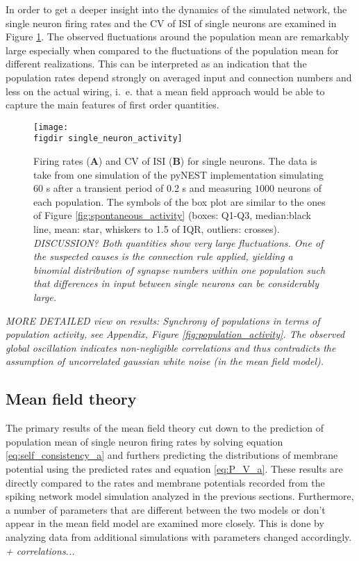 In order to get a deeper insight into the dynamics of the simulated network, the single neuron firing 
rates and the CV of ISI of single neurons are examined in Figure \ref{fig:single_neuron_activity}.
The observed fluctuations around the population mean are remarkably large especially when compared 
to the fluctuations of the population mean for different realizations. This can be interpreted as 
an indication that the population rates depend strongly on averaged input and connection numbers
and less on the actual wiring, i.~e. that a mean field approach would be able to capture the main features 
of first order quantities. 
\begin{figure}[htpb]
    \centering
    \texttt{[image: \\figdir single\_neuron\_activity]}
    \caption{
        Firing rates (\textbf{A}) and CV of ISI (\textbf{B}) for single neurons. 
        The data is take from one simulation of the pyNEST implementation 
        simulating $60$ s after a transient period of 0.2 s and measuring 
        $1000$ neurons of each population. The symbols of the box plot 
        are similar to the ones of Figure \ref{fig:spontaneous_activity} 
        (boxes: Q1-Q3, median:black line, mean: star, 
        whiskers to 1.5 of IQR, outliers: crosses). 
        \\\emph{DISCUSSION?
        Both quantities show very large fluctuations. One of the suspected
        causes is the connection rule applied, yielding a binomial distribution 
        of synapse numbers within one population
        such that differences in input between single neurons can be 
    considerably large.}
    }
    \label{fig:single_neuron_activity}
\end{figure}

\emph{MORE DETAILED view on results:
Synchrony of populations in terms of population activity, 
see Appendix, Figure \ref{fig:population_activity}. 
The observed global oscillation indicates non-negligible correlations
and thus contradicts the assumption of uncorrelated gaussian white noise 
(in the mean field model).}

\subsection{Mean field theory}
The primary results of the mean field theory cut down to the prediction of 
population mean of single neuron firing rates by solving equation 
\eqref{eq:self_consistency_a} and furthers predicting the 
distributions of membrane potential using the predicted rates and 
equation \eqref{eq:P_V_a}. These results are directly compared to 
the rates and membrane potentials recorded from the spiking network 
model simulation analyzed in the previous sections. Furthermore, 
a number of parameters that are different between the two models 
or don't appear in the mean field model are examined more closely. 
This is done by analyzing data from additional simulations with 
parameters changed accordingly. 
\emph{+ correlations...}

